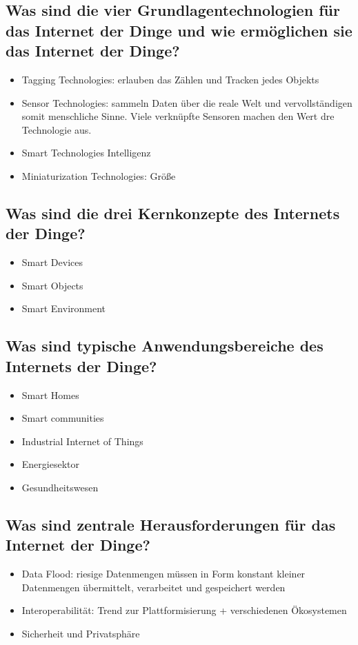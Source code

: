 \documentclass{article}
\begin{document}
\subsection{Was sind die vier Grundlagentechnologien für das Internet der Dinge und wie ermöglichen sie das Internet der Dinge?}
\begin{itemize}
    \item Tagging Technologies: erlauben das Zählen und Tracken jedes Objekts
    \item Sensor Technologies: sammeln Daten über die reale Welt und vervollständigen somit menschliche Sinne. Viele verknüpfte Sensoren machen den Wert dre Technologie aus. 
    \item Smart Technologies Intelligenz
    \item Miniaturization Technologies: Größe
\end{itemize}
\subsection{Was sind die drei Kernkonzepte des Internets der Dinge?}
\begin{itemize}
    \item Smart Devices 
    \item Smart Objects
    \item Smart Environment
\end{itemize}
\subsection{Was sind typische Anwendungsbereiche des Internets der Dinge?}
\begin{itemize}
    \item Smart Homes
    \item Smart communities
    \item Industrial Internet of Things
    \item Energiesektor
    \item Gesundheitswesen
\end{itemize}
\subsection{Was sind zentrale Herausforderungen für das Internet der Dinge?}
\begin{itemize}
    \item Data Flood: riesige Datenmengen müssen in Form konstant kleiner Datenmengen übermittelt, verarbeitet und gespeichert werden
    \item Interoperabilität: Trend zur Plattformisierung + verschiedenen Ökosystemen
    \item Sicherheit und Privatsphäre
\end{itemize}
\end{document}
